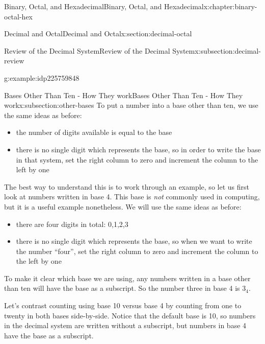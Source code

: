 \documentclass[twoside,10pt,]{book}
\newcommand{\tabularfont}{\relax}
\numberwithin{equation}{section}
\newcommand{\hrulethick} {\noalign{\hrule height 0.11em}}
\begin{document}
\begin{chapterptx}{Binary, Octal, and Hexadecimal}{}{Binary, Octal, and Hexadecimal}{}{}{x:chapter:binary-octal-hex}
\begin{sectionptx}{Decimal and Octal}{}{Decimal and Octal}{}{}{x:section:decimal-octal}
\begin{subsectionptx}{Review of the Decimal System}{}{Review of the Decimal System}{}{}{x:subsection:decimal-review}
\begin{example}{}{g:example:idp225759848}
%
\end{example}
\end{subsectionptx}
%
%
\typeout{************************************************}
\typeout{************************************************}
%
\begin{subsectionptx}{Bases Other Than Ten - How They work}{}{Bases Other Than Ten - How They work}{}{}{x:subsection:other-bases}
To put a number into a base other than ten, we use the same ideas as before: %
\begin{itemize}[label=\textbullet]
\item{}the number of digits available is equal to the base%
\item{}there is no single digit which represents the base, so in order to write the base in that system, set the right column to zero and increment the column to the left by one%
\end{itemize}
%
\par
The best way to understand this is to work through an example, so let us first look at numbers written in base 4.  This base is \emph{not} commonly used in computing, but it is a useful example nonetheless.  We will use the same ideas as before:%
\begin{itemize}[label=\textbullet]
\item{}there are four digits in total:  0,1,2,3%
\item{}there is no single digit which represents the base, so when we want to write the number ``four'', set the right column to zero and increment the column to the left by one%
\end{itemize}
%
\par
To make it clear which base we are using, any numbers written in a base other than ten will have the base as a subscript.  So the number three in base 4 is \(3_4\).%
\par
Let's contrast counting using base 10 versus base 4 by counting from one to twenty in both bases side-by-side.   Notice that the default base is 10, so numbers in the decimal system are written without a subscript, but numbers in base 4 have the base as a subscript.%
\begin{sidebyside}{2}{0.2}{0.2}{0.2}%
\begin{sbspanel}{0.2}%
\resizebox{\ifdim\width > \linewidth\linewidth\else\width\fi}{!}{%
{\centering%
{\tabularfont%
\begin{tabular}{cc}\hrulethick

\end{tabular}}}}
\end{sbspanel}
\end{sidebyside}
\end{subsectionptx}
\end{sectionptx}
\end{chapterptx}
\end{document}

